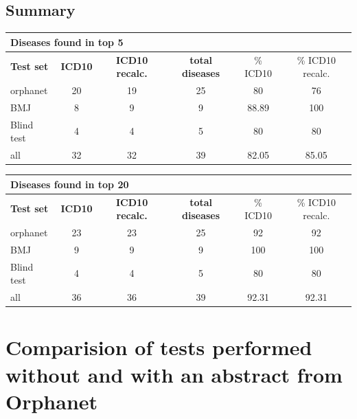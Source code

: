 \documentclass[10pt,letterpaper,final]{article}
\begin{document}
\subsection{Summary}
\label{app:summary_icd10_icd10recalc}

\begin{center}
\begin{small}
\begin{tabular}{l|cc||ccc}
	\multicolumn{6}{l}{\textbf{Diseases found in top 5}} \\ \hline
\textbf{Test set} & \textbf{ICD10} &	\textbf{ICD10 recalc.}	 &	\textbf{total diseases} &	\% ICD10 &\% ICD10 recalc. \\ \hline
orphanet    &     20  &  19    &     25  &   80   & 76 \\
BMJ	        &   8    &    9  &    9   &    88.89  & 100 \\
Blind test	&   4    &    4  &    5   &    80  & 80 \\ \hline \hline
all	        &   32    &   32   &   39    &   82.05   & 85.05 \\ \hline
\end{tabular}
\end{small}
\end{center}

\begin{center}
\begin{small}
\begin{tabular}{l|cc||ccc}
	\multicolumn{6}{l}{\textbf{Diseases found in top 20}} \\ \hline
\textbf{Test set} & \textbf{ICD10} &	\textbf{ICD10 recalc.}	 &	\textbf{total diseases} &	\% ICD10 &\% ICD10 recalc. \\ \hline
orphanet    &   23    &  23    &   25    &   92   & 92 \\
BMJ	        &    9   &   9   &     9  &   100   & 100 \\
Blind test	&    4   &   4   &    5   &   80   & 80 \\ \hline \hline
all	        &    36   &  36    &   39    &  92.31  & 92.31 \\ \hline
\end{tabular}
\end{small}
\end{center}



\newpage
\section{Comparision of tests performed without and with an abstract from Orphanet}
\label{app:with_without}
\end{document}
